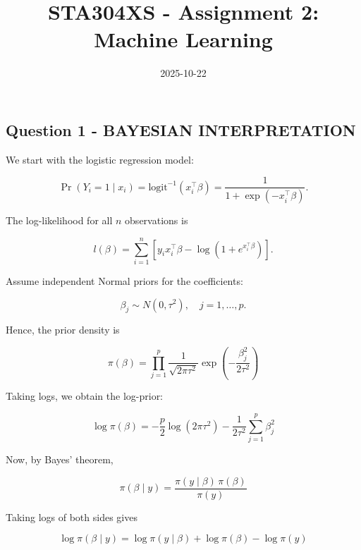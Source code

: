 \documentclass[12pt,halfline,a4paper,]{ouparticle}
\begin{document}
\title{STA304XS - Assignment 2: Machine Learning}

\author{%
%
%
%
%
%
%
%
%
%
\and
{}
%
%
%
%
%
%
}

\abstract{}

\date{2025-10-22}

\keywords{}

\maketitle



\newpage
\tableofcontents
\newpage

\subsection{Question 1 - BAYESIAN
INTERPRETATION}\label{question-1---bayesian-interpretation}

We start with the logistic regression model:

\[\Pr(Y_i = 1 \mid x_i) = \text{logit}^{-1}(x_i^\top \beta) = \dfrac{1}{1 + \exp(-x_i^\top \beta)}.\]

The log-likelihood for all \(n\) observations is

\[l(\beta) = \sum_{i=1}^n \left[ y_i x_i^\top \beta - \log(1 + e^{x_i^\top \beta}) \right].\]

Assume independent Normal priors for the coefficients:

\[\beta_j \sim N(0, \tau^2), \quad j = 1, \ldots, p.\]

Hence, the prior density is

\[\pi(\beta) = \prod_{j=1}^p \dfrac{1}{\sqrt{2\pi\tau^2}}
\exp\!\left(-\dfrac{\beta_j^2}{2\tau^2}\right)\]

Taking logs, we obtain the log-prior:

\[\log \pi(\beta) = -\dfrac{p}{2}\log(2\pi\tau^2)
-\dfrac{1}{2\tau^2}\sum_{j=1}^p \beta_j^2\]

Now, by Bayes' theorem,

\[\pi(\beta \mid y) = \dfrac{\pi(y \mid \beta)\, \pi(\beta)}{\pi(y)}\]

Taking logs of both sides gives

\[\log \pi(\beta \mid y) = \log \pi(y \mid \beta) + \log \pi(\beta) - \log \pi(y)\]
\end{document}
